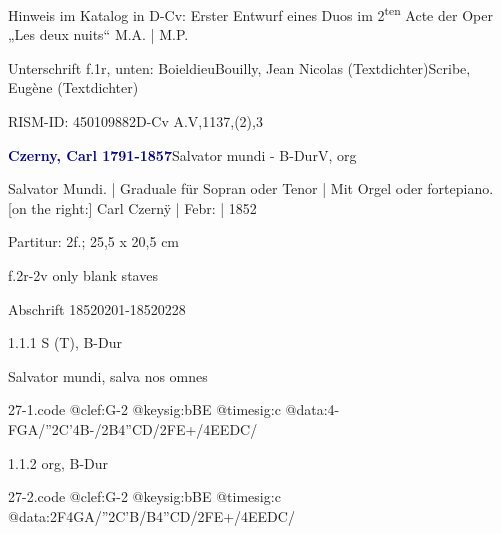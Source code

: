 \documentclass[a4paper, twocolumn, 11pt]{book}
\begin{document}
\newline %
\par Hinweis im Katalog in D-Cv: Erster Entwurf eines Duos im 2\textsuperscript{t}\textsuperscript{e}\textsuperscript{n} Acte der Oper „Les deux nuits“ M.A. | M.P.
\par Unterschrift f.1r, unten: Boieldieu\newline Bouilly, Jean Nicolas  (Textdichter)\newline Scribe, Eugène  (Textdichter)
\par RISM-ID: 450109882\newline D-Cv  A.V,1137,(2),3
\par \vspace{16pt} \textcolor{darkblue}{\textbf{Czerny, Carl  1791-1857}}\hfillplus{[27]}\newline Salvator mundi - B-Dur\newline V, org
\par \begin{itshape} Salvator Mundi. | Graduale für Sopran oder Tenor | Mit Orgel oder fortepiano. [on the right:] Carl Czernÿ | Febr: | 1852\end{itshape} 
\par \textcolor{darkblue}{}  Partitur: 2f.; 25,5 x 20,5 cm\newline \begin{small} f.2r-2v only blank staves\end{small} \newline Abschrift  18520201-18520228
\par 1.1.1  S (T), B-Dur\newline \begin{footnotesize} Salvator mundi, salva nos omnes \end{footnotesize}  
\begin{filecontents*}{27-1.code}
@clef:G-2
@keysig:bBE
@timesig:c
@data:4-FGA/''2C'4B-/2B4''CD/2FE+/4EEDC/
\end{filecontents*}

\newline %
\par 1.1.2  org, B-Dur  
\begin{filecontents*}{27-2.code}
@clef:G-2
@keysig:bBE
@timesig:c
@data:2F4GA/''2C'B/B4''CD/2FE+/4EEDC/
\end{filecontents*}
\end{document}
